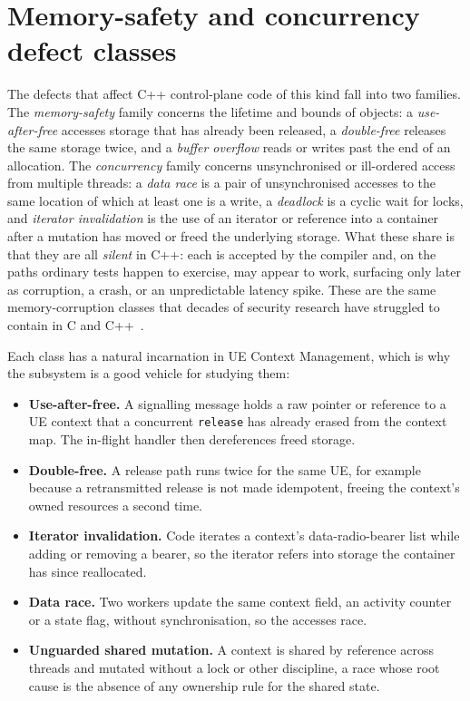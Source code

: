 \documentclass[english,twoside,openright,a4paper,censored,csm,software-track-2020]{HYthesisML}
\begin{document}
\section{Memory-safety and concurrency defect classes}
The defects that affect C++ control-plane code of this kind fall into two families. The
\emph{memory-safety} family concerns the lifetime and bounds of objects: a \emph{use-after-free}
accesses storage that has already been released, a \emph{double-free} releases the same storage
twice, and a \emph{buffer overflow} reads or writes past the end of an allocation. The
\emph{concurrency} family concerns unsynchronised or ill-ordered access from multiple threads: a
\emph{data race} is a pair of unsynchronised accesses to the same location of which at least one
is a write, a \emph{deadlock} is a cyclic wait for locks, and \emph{iterator invalidation} is
the use of an iterator or reference into a container after a mutation has moved or freed the
underlying storage. What these share is that they are all \emph{silent} in C++: each is accepted
by the compiler and, on the paths ordinary tests happen to exercise, may appear to work,
surfacing only later as corruption, a crash, or an unpredictable latency spike. These are the
same memory-corruption classes that decades of security research have struggled to contain in C
and C++~\cite{szekeres2013sok}.

Each class has a natural incarnation in UE Context Management, which is why the subsystem is a
good vehicle for studying them:

\begin{itemize}
  \item \textbf{Use-after-free.} A signalling message holds a raw pointer or reference to a UE
        context that a concurrent \texttt{release} has already erased from the context map. The
        in-flight handler then dereferences freed storage.
  \item \textbf{Double-free.} A release path runs twice for the same UE, for example because a
        retransmitted release is not made idempotent, freeing the context's owned resources a
        second time.
  \item \textbf{Iterator invalidation.} Code iterates a context's data-radio-bearer list while
        adding or removing a bearer, so the iterator refers into storage the container has since
        reallocated.
  \item \textbf{Data race.} Two workers update the same context field, an activity counter or a
        state flag, without synchronisation, so the accesses race.
  \item \textbf{Unguarded shared mutation.} A context is shared by reference across threads and
        mutated without a lock or other discipline, a race whose root cause is the absence of any
        ownership rule for the shared state.
\end{itemize}
\end{document}
